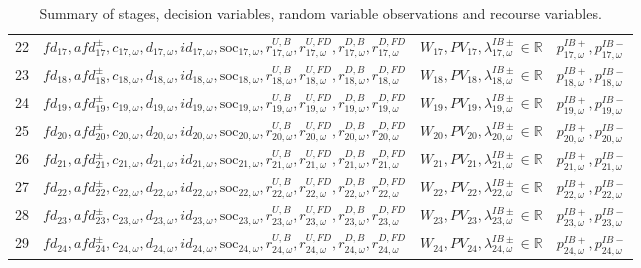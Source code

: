 \documentclass{article}
\newcommand{\R}{\mathbb{R}}
\newcommand{\soc}{\text{soc}}
\begin{document}
\begin{table}
\begin{tabular}{c c c c}
	22 & $fd_{17}, afd^{\pm}_{17}, c_{17, \omega}, d_{17, \omega}, id_{17, \omega}, \soc_{17, \omega}, r^{U, B}_{17, \omega}, r^{U, FD}_{17, \omega}, r^{D, B}_{17, \omega}, r^{D, FD}_{17, \omega}$ & $W_{17}, PV_{17}, \lambda^{IB\pm}_{17, \omega} \in \R$ & $p^{IB+}_{17, \omega}, p^{IB-}_{17, \omega}$ \\
	23 & $fd_{18}, afd^{\pm}_{18}, c_{18, \omega}, d_{18, \omega}, id_{18, \omega}, \soc_{18, \omega}, r^{U, B}_{18, \omega}, r^{U, FD}_{18, \omega}, r^{D, B}_{18, \omega}, r^{D, FD}_{18, \omega}$ & $W_{18}, PV_{18}, \lambda^{IB\pm}_{18, \omega} \in \R$ &  $p^{IB+}_{18, \omega}, p^{IB-}_{18, \omega}$ \\
	24 & $fd_{19}, afd^{\pm}_{19}, c_{19, \omega}, d_{19, \omega}, id_{19, \omega}, \soc_{19, \omega}, r^{U, B}_{19, \omega}, r^{U, FD}_{19, \omega}, r^{D, B}_{19, \omega}, r^{D, FD}_{19, \omega}$ & $W_{19}, PV_{19}, \lambda^{IB\pm}_{19, \omega} \in \R$ & $p^{IB+}_{19, \omega}, p^{IB-}_{19, \omega}$ \\
	25 & $fd_{20}, afd^{\pm}_{20}, c_{20, \omega}, d_{20, \omega}, id_{20, \omega}, \soc_{20, \omega}, r^{U, B}_{20, \omega}, r^{U, FD}_{20, \omega}, r^{D, B}_{20, \omega}, r^{D, FD}_{20, \omega}$  & $W_{20}, PV_{20}, \lambda^{IB\pm}_{20, \omega} \in \R$ & $p^{IB+}_{20, \omega}, p^{IB-}_{20, \omega}$ \\
	26 & $fd_{21}, afd^{\pm}_{21}, c_{21, \omega}, d_{21, \omega}, id_{21, \omega}, \soc_{21, \omega}, r^{U, B}_{21, \omega}, r^{U, FD}_{21, \omega}, r^{D, B}_{21, \omega}, r^{D, FD}_{21, \omega}$ & $W_{21}, PV_{21}, \lambda^{IB\pm}_{21, \omega} \in \R$ & $p^{IB+}_{21, \omega}, p^{IB-}_{21, \omega}$ \\
	27 & $fd_{22}, afd^{\pm}_{22}, c_{22, \omega}, d_{22, \omega}, id_{22, \omega}, \soc_{22, \omega}, r^{U, B}_{22, \omega}, r^{U, FD}_{22, \omega}, r^{D, B}_{22, \omega}, r^{D, FD}_{22, \omega}$ & $W_{22}, PV_{22}, \lambda^{IB\pm}_{22, \omega} \in \R$ & $p^{IB+}_{22, \omega}, p^{IB-}_{22, \omega}$ \\
	28 & $fd_{23}, afd^{\pm}_{23}, c_{23, \omega}, d_{23, \omega}, id_{23, \omega}, \soc_{23, \omega}, r^{U, B}_{23, \omega}, r^{U, FD}_{23, \omega}, r^{D, B}_{23, \omega}, r^{D, FD}_{23, \omega}$ & $W_{23}, PV_{23}, \lambda^{IB\pm}_{23, \omega} \in \R$ & $p^{IB+}_{23, \omega}, p^{IB-}_{23, \omega}$ \\
	29 & $fd_{24}, afd^{\pm}_{24}, c_{24, \omega}, d_{24, \omega}, id_{24, \omega}, \soc_{24, \omega}, r^{U, B}_{24, \omega}, r^{U, FD}_{24, \omega}, r^{D, B}_{24, \omega}, r^{D, FD}_{24, \omega}$ & $W_{24}, PV_{24}, \lambda^{IB\pm}_{24, \omega} \in \R$ & $p^{IB+}_{24, \omega}, p^{IB-}_{24, \omega}$ \\

\end{tabular}
\caption{Summary of stages, decision variables, random variable observations and recourse variables.}
\label{TABLE:stages-rv-dv}
\end{table}



\printbibliography
\end{document}
